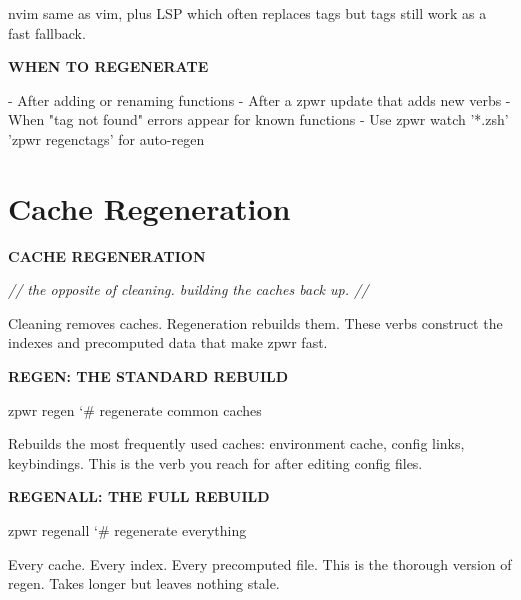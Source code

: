 \documentclass[11pt,a4paper,twoside]{book}
\begin{document}
nvim   same as vim, plus LSP which often replaces tags but tags still work as a fast fallback.


\vspace{12pt}
{\bfseries\color{neonyellow} WHEN TO REGENERATE}\vspace{4pt}

- After adding or renaming functions - After a zpwr update that adds new verbs - When "tag not found" errors appear for known functions - Use zpwr watch '*.zsh' 'zpwr regenctags' for auto-regen


\vspace{16pt}

\section{Cache Regeneration}


\vspace{10pt}
{\large\bfseries\color{neoncyan} CACHE REGENERATION}\vspace{6pt}

{\small\itshape\color{dimtext} // the opposite of cleaning. building the caches back up. //}

Cleaning removes caches. Regeneration rebuilds them. These verbs construct the indexes and precomputed data that make zpwr fast.


\vspace{12pt}
{\bfseries\color{neonyellow} REGEN: THE STANDARD REBUILD}\vspace{4pt}

\begin{codebox}
\color{neongreen}zpwr regen                          {\char`\#} regenerate common caches\\
\end{codebox}

Rebuilds the most frequently used caches: environment cache, config links, keybindings. This is the verb you reach for after editing config files.


\vspace{12pt}
{\bfseries\color{neonyellow} REGENALL: THE FULL REBUILD}\vspace{4pt}

\begin{codebox}
\color{neongreen}zpwr regenall                       {\char`\#} regenerate everything\\
\end{codebox}

Every cache. Every index. Every precomputed file. This is the thorough version of regen. Takes longer but leaves nothing stale.
\end{document}
